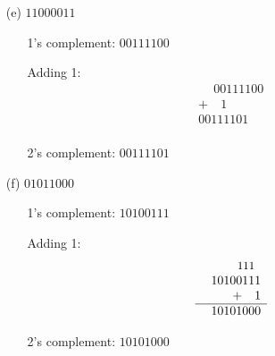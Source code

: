 \documentclass[a4paper,12pt]{article}
\begin{document}
\begin{enumerate}
\begin{enumerate}
    \item[(e)] $11000011$
        \begin{itemize}
            \item[\ding{221}] 1’s complement: $00111100$
            \item[\ding{105}] Adding 1:
                  \[
                  \begin{array}{r}
                    \phantom{+}00111100 \\
                    +\quad 1 \\
                    \hline
                    00111101 \\
                  \end{array}
                  \]
            \item[\ding{221}] 2’s complement: $00111101$
        \end{itemize}

    \item[(f)] $01011000$
        \begin{itemize}
            \item[\ding{221}] 1’s complement: $10100111$
            \item[\ding{105}] Adding 1:
                  \[
                  \begin{array}{r}

                    \quad \text{\small 111}\phantom{0}\\
                    \phantom{+}10100111 \\
                    +\quad 1 \\
                    \hline
                    10101000 \\
                  \end{array}
                  \]
            \item[\ding{221}] 2’s complement: $10101000$
        \end{itemize}
\end{enumerate}
\end{enumerate}
\end{document}
